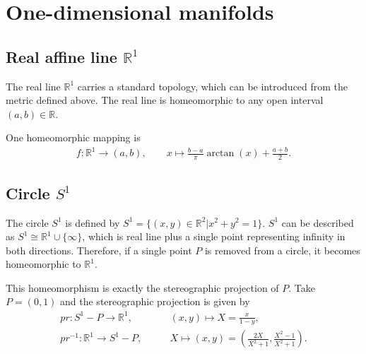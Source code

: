 \documentclass{report}
\theoremstyle{nonumberplain}
\begin{document}
\section{One-dimensional manifolds}
\subsection{Real affine line $\mathbb{R}^1$}
The real line $\mathbb{R}^1$ carries a standard topology, which can be introduced from the metric defined above. The real line is homeomorphic to any open interval $(a, b)\in\mathbb{R}$.
\begin{center}
\end{center}
One homeomorphic mapping is
\begin{align*}
	f:\mathbb{R}^1\longrightarrow(a, b),\qquad
	x\longmapsto \frac{b-a}{\pi}\arctan\left(x\right)+\frac{a+b}{2}.
\end{align*}

\subsection{Circle $S^1$}
The circle $S^1$ is defined by $S^1=\{(x,y)\in\mathbb{R}^2|x^2+y^2=1\}$. $S^1$ can be described as $S^1\cong \mathbb{R}^1\cup\{\infty\}$, which is real line plus a single point representing infinity in both directions. Therefore, if a single point $P$ is removed from a circle, it becomes homeomorphic to $\mathbb{R}^1$.
\begin{center}
\end{center}
This homeomorphism is exactly the stereographic projection of $P$. Take $P=(0,1)$ and the stereographic projection is given by
\begin{align*}
	pr:S^1-P\longrightarrow \mathbb{R}^1,\qquad      & (x, y) \longmapsto X=\frac{x}{1-y},                                           \\
	pr^{-1}:\mathbb{R}^1\longrightarrow S^1-P,\qquad & X \longmapsto(x, y)=\left(\frac{2X}{X^{2}+1}, \frac{X^{2}-1}{X^{2}+1}\right).
\end{align*}
\end{document}
